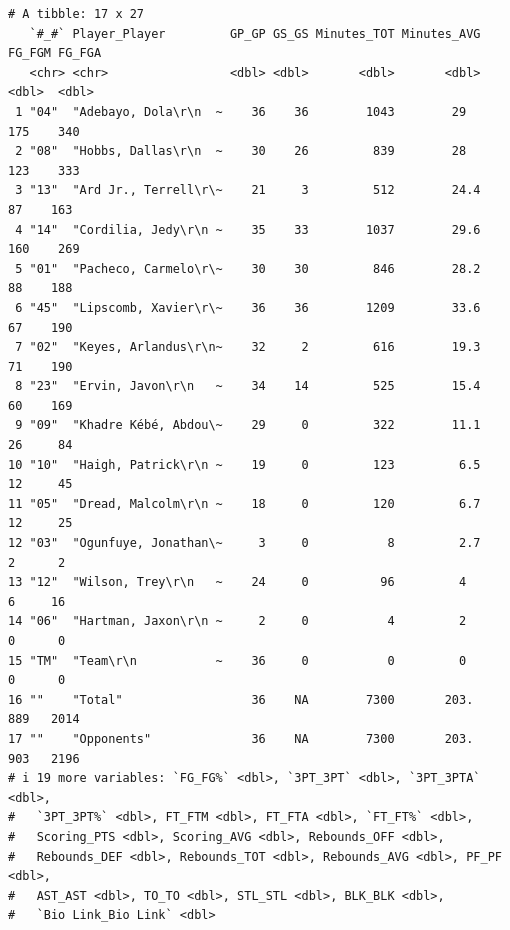 \documentclass[
  letterpaper,
  DIV=11,
  numbers=noendperiod]{scrreprt}
\begin{document}
\begin{verbatim}
# A tibble: 17 x 27
   `#_#` Player_Player         GP_GP GS_GS Minutes_TOT Minutes_AVG FG_FGM FG_FGA
   <chr> <chr>                 <dbl> <dbl>       <dbl>       <dbl>  <dbl>  <dbl>
 1 "04"  "Adebayo, Dola\r\n  ~    36    36        1043        29      175    340
 2 "08"  "Hobbs, Dallas\r\n  ~    30    26         839        28      123    333
 3 "13"  "Ard Jr., Terrell\r\~    21     3         512        24.4     87    163
 4 "14"  "Cordilia, Jedy\r\n ~    35    33        1037        29.6    160    269
 5 "01"  "Pacheco, Carmelo\r\~    30    30         846        28.2     88    188
 6 "45"  "Lipscomb, Xavier\r\~    36    36        1209        33.6     67    190
 7 "02"  "Keyes, Arlandus\r\n~    32     2         616        19.3     71    190
 8 "23"  "Ervin, Javon\r\n   ~    34    14         525        15.4     60    169
 9 "09"  "Khadre Kébé, Abdou\~    29     0         322        11.1     26     84
10 "10"  "Haigh, Patrick\r\n ~    19     0         123         6.5     12     45
11 "05"  "Dread, Malcolm\r\n ~    18     0         120         6.7     12     25
12 "03"  "Ogunfuye, Jonathan\~     3     0           8         2.7      2      2
13 "12"  "Wilson, Trey\r\n   ~    24     0          96         4        6     16
14 "06"  "Hartman, Jaxon\r\n ~     2     0           4         2        0      0
15 "TM"  "Team\r\n           ~    36     0           0         0        0      0
16 ""    "Total"                  36    NA        7300       203.     889   2014
17 ""    "Opponents"              36    NA        7300       203.     903   2196
# i 19 more variables: `FG_FG%` <dbl>, `3PT_3PT` <dbl>, `3PT_3PTA` <dbl>,
#   `3PT_3PT%` <dbl>, FT_FTM <dbl>, FT_FTA <dbl>, `FT_FT%` <dbl>,
#   Scoring_PTS <dbl>, Scoring_AVG <dbl>, Rebounds_OFF <dbl>,
#   Rebounds_DEF <dbl>, Rebounds_TOT <dbl>, Rebounds_AVG <dbl>, PF_PF <dbl>,
#   AST_AST <dbl>, TO_TO <dbl>, STL_STL <dbl>, BLK_BLK <dbl>,
#   `Bio Link_Bio Link` <dbl>
\end{verbatim}
\end{document}
